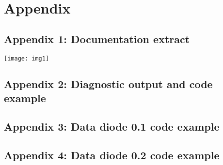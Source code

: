 \documentclass[a4paper,11pt]{scrartcl}
\begin{document}
\pagebreak
\section{Appendix}
\subsection{Appendix 1: Documentation extract}
\texttt{[image: img1]}
\pagebreak
\subsection{Appendix 2: Diagnostic output and code example}



\pagebreak
\subsection{Appendix 3: Data diode 0.1 code example}


\pagebreak
\subsection{Appendix 4: Data diode 0.2 code example}


\pagebreak



\end{document}

